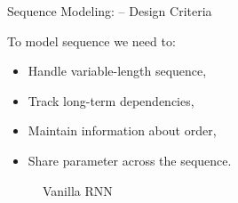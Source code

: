 \begin{frame} {Sequence Modeling: -- Design Criteria}

To model sequence we need to:


  \begin{itemize}
    \item Handle variable-length sequence,
    \item Track long-term dependencies,
    \item Maintain information about order,
    \item Share parameter across the sequence.
  \end{itemize}

  \begin{figure}
      \centering
      \caption{\footnotesize {Vanilla RNN}}
  \end{figure}

\end{frame}

